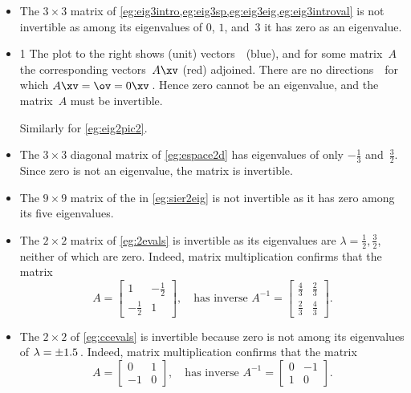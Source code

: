 \begin{example} 
\begin{itemize}
\item The \(3\times 3\) matrix of \cref{eg:eig3intro,eg:eig3sp,eg:eig3eig,eg:eig3introval} is not invertible as among its eigenvalues of \(0\), \(1\), and~\(3\) it has zero as an eigenvalue.

\item 
\begin{figbox}{1}%
The plot to the right shows (unit) vectors~\xv\ (blue), and for some matrix~\(A\) the corresponding vectors~\(A\xv\) (red) adjoined.
There are no directions~\xv\ for which \(A\xv=\ov=0\xv\)\,. 
Hence zero cannot be an eigenvalue, and the matrix~\(A\) must be invertible.
\par\vspace{1\baselineskip}
Similarly for \cref{eg:eig2pic2}.
\par\vspace{1ex}
\end{figbox}

\item The \(3\times3\) diagonal matrix of \cref{eg:espace2d} has eigenvalues of only \(-\tfrac13\) and~\(\tfrac32\).
Since zero is not an eigenvalue, the matrix is invertible.


\item The \(9\times9\) matrix of the  in \cref{eg:sier2eig} is not invertible as it has zero among its five eigenvalues.

\item The \(2\times 2\) matrix of \cref{eg:2evals} is invertible as its eigenvalues are \(\lambda=\frac12,\frac32\), neither of which are zero.
Indeed, matrix multiplication confirms that the matrix
\begin{equation*}
A=\begin{bmatrix} 1&-\frac12\\-\frac12&1 \end{bmatrix},
\quad\text{has inverse }A^{-1}=\begin{bmatrix} \frac43&\frac23\\\frac23&\frac43 \end{bmatrix}.
\end{equation*}


\item The \(2\times2\)  of \cref{eg:ccevals} is invertible because zero is not among its eigenvalues of \(\lambda=\pm 1.5\)\,.
Indeed, matrix multiplication confirms that the matrix
\begin{equation*}
A=\begin{bmatrix} 0&1\\-1&0 \end{bmatrix},
\quad\text{has inverse }A^{-1}=\begin{bmatrix} 0&-1\\1&0 \end{bmatrix}.
\end{equation*}
\end{itemize}
\end{example}



